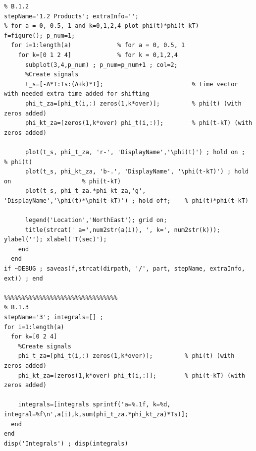 \documentclass[11pt]{article}
\begin{document}
\begin{lstlisting}[caption = {\texttt{part\_b.m}}]
%%%%%%%%%%%%%%%%%%%%%%%%%%%%%%%%
% B.1.2
stepName='1.2 Products'; extraInfo='';
% for a = 0, 0.5, 1 and k=0,1,2,4 plot phi(t)*phi(t-kT)
f=figure(); p_num=1;
  for i=1:length(a)             % for a = 0, 0.5, 1
    for k=[0 1 2 4]             % for k = 0,1,2,4
      subplot(3,4,p_num) ; p_num=p_num+1 ; col=2;
      %Create signals
      t_s=[-A*T:Ts:(A+k)*T];                         % time vector with needed extra time added for shifting
      phi_t_za=[phi_t(i,:) zeros(1,k*over)];         % phi(t) (with zeros added)
      phi_kt_za=[zeros(1,k*over) phi_t(i,:)];        % phi(t-kT) (with zeros added)
      
      plot(t_s, phi_t_za, 'r-', 'DisplayName','\phi(t)') ; hold on ;                        % phi(t) 
      plot(t_s, phi_kt_za, 'b-.', 'DisplayName', '\phi(t-kT)') ; hold on                    % phi(t-kT)
      plot(t_s, phi_t_za.*phi_kt_za,'g', 'DisplayName','\phi(t)*\phi(t-kT)') ; hold off;    % phi(t)*phi(t-kT) 
      
      legend('Location','NorthEast'); grid on;
      title(strcat(' a=',num2str(a(i)), ', k=', num2str(k))); ylabel(''); xlabel('T(sec)'); 
    end
  end
if ~DEBUG ; saveas(f,strcat(dirpath, '/', part, stepName, extraInfo, ext)) ; end

%%%%%%%%%%%%%%%%%%%%%%%%%%%%%%%%
% B.1.3
stepName='3'; integrals=[] ;
for i=1:length(a)
  for k=[0 2 4]
    %Create signals
    phi_t_za=[phi_t(i,:) zeros(1,k*over)];         % phi(t) (with zeros added)
    phi_kt_za=[zeros(1,k*over) phi_t(i,:)];        % phi(t-kT) (with zeros added)
  
    integrals=[integrals sprintf('a=%.1f, k=%d, integral=%f\n',a(i),k,sum(phi_t_za.*phi_kt_za)*Ts)];
  end
end
disp('Integrals') ; disp(integrals)
\end{lstlisting}
\end{document}
